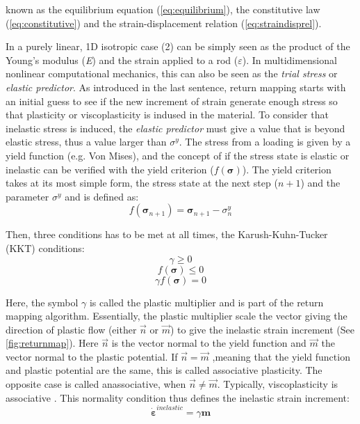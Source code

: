 \documentclass[final,5p,times,twocolumn]{elsarticle}
\begin{document}
known as the equilibrium equation (\cref{eq:equilibrium}), the constitutive law (\cref{eq:constitutive}) and  the strain-displacement relation (\cref{eq:straindisprel}). 

In a purely linear, 1D isotropic case (2) can be simply seen as the product of the Young's modulus (\textit{E}) and the strain applied to a rod ($\varepsilon$). In multidimensional nonlinear computational mechanics, this can also be seen as the \textit{trial stress} or \textit{elastic predictor}. As introduced in the last sentence, return mapping starts with an initial guess to see if the new increment of strain generate enough stress so that plasticity or viscoplasticity is indused in the material. To consider that inelastic stress is induced, the \textit{elastic predictor} must give a value that is beyond elastic stress, thus a value larger than $\sigma^{y}$. The stress from a loading is given by a yield function (e.g. Von Mises), and the concept of if the stress state is elastic or inelastic can be verified with the yield criterion ($f(\boldsymbol{\sigma})$). The yield criterion takes at its most simple form, the stress state at the next step ($n+1$) and the parameter $\sigma^{y}$ and is defined as:
\begin{equation}
  f (\boldsymbol{\sigma}_{n+1}) = \boldsymbol{\sigma}_{n+1} - \sigma^{y}_{n} \label{eq:yieldcrit_simple}
\end{equation}

Then, three conditions has to be met at all times, the Karush-Kuhn-Tucker (KKT) conditions:
\begin{equation}
  \gamma \geq 0 \label{eq:kkt1}
\end{equation}
\begin{equation}
  f(\boldsymbol{\sigma}) \leq 0 \label{eq:kkt2}
\end{equation}
\begin{equation}
  \gamma f(\boldsymbol{\sigma})  = 0 \label{eq:kkt3}
\end{equation}


Here, the symbol $\gamma$ is called the plastic multiplier and is part of the return mapping algorithm. Essentially, the plastic multiplier scale the vector giving the direction of plastic flow (either $\vec{n}$ or $\vec{m}$) to give the inelastic strain increment (See \cref{fig:returnmap}). Here $\vec{n}$ is the vector normal to the yield function and $\vec{m}$ the vector normal to the plastic potential. If $\vec{n}=\vec{m}$ ,meaning that the yield function and plastic potential are the same, this is called associative plasticity. The opposite case is called anassociative, when $\vec{n} \neq \vec{m}$. Typically, viscoplasticity is associative \cite{MACrisfield2012,Simo1998Computational}. This normality condition thus defines the inelastic strain increment:
\begin{equation}
  \boldsymbol{\dot{\varepsilon}}^{inelastic}=\gamma \boldsymbol{m} \label{eq:normality}
\end{equation}
\end{document}
